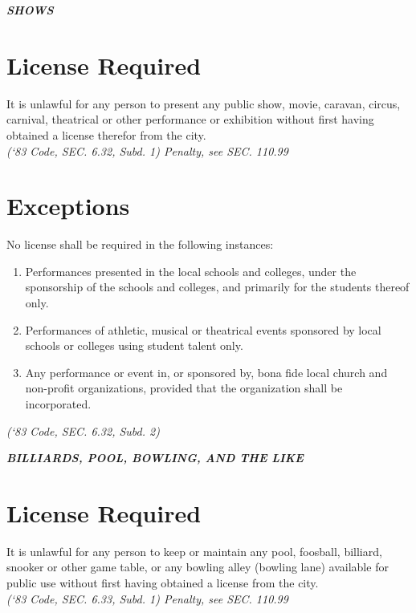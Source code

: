 \begin{center}
    \emph{\textbf{\LARGE{SHOWS}}}
\end{center}

\setcounter{section}{29}
\section{License Required}
It is unlawful for any person to present any public show, movie, caravan, circus, carnival, theatrical or other performance or exhibition without first having obtained a license therefor from the city.\\
\emph{(‘83 Code, SEC. 6.32, Subd. 1)  Penalty, see SEC. 110.99}
\section{Exceptions}
No license shall be required in the following instances:
\begin{enumerate}[{\indent}A)]
    \item Performances presented in the local schools and colleges, under the sponsorship of the schools and colleges, and primarily for the students thereof only.
    \item Performances of athletic, musical or theatrical events sponsored by local schools or colleges using student talent only.
    \item Any performance or event in, or sponsored by, bona fide local church and non-profit organizations, provided that the organization shall be incorporated.
\end{enumerate}
\emph{(‘83 Code, SEC. 6.32, Subd. 2)}

\begin{center}
    \emph{\textbf{\LARGE{BILLIARDS, POOL, BOWLING, AND THE LIKE}}}
\end{center}

\setcounter{section}{44}
\section{License Required}
It is unlawful for any person to keep or maintain any pool, foosball, billiard, snooker or other game table, or any bowling alley (bowling lane) available for public use without first having obtained a license from the city.\\
\emph{(‘83 Code, SEC. 6.33, Subd. 1)  Penalty, see SEC. 110.99}
